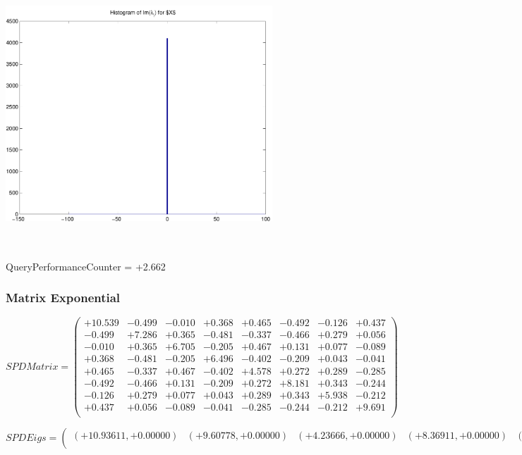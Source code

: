 \documentclass[9pt]{article}
\theoremstyle{plain}
\theoremstyle{definition}
\theoremstyle{remark}
\numberwithin{equation}{section}
\begin{document}
\includegraphics[width=10.0cm,height=10.0cm]{Im_lambda_n.pdf}

QueryPerformanceCounter  =  +2.662
\subsubsection{Matrix Exponential }
$SPD Matrix = \left(
\begin{array}{
cccccccc}
+10.539 & -0.499 & -0.010 & +0.368 & +0.465 & -0.492 & -0.126 & +0.437 \\
-0.499 & +7.286 & +0.365 & -0.481 & -0.337 & -0.466 & +0.279 & +0.056 \\
-0.010 & +0.365 & +6.705 & -0.205 & +0.467 & +0.131 & +0.077 & -0.089 \\
+0.368 & -0.481 & -0.205 & +6.496 & -0.402 & -0.209 & +0.043 & -0.041 \\
+0.465 & -0.337 & +0.467 & -0.402 & +4.578 & +0.272 & +0.289 & -0.285 \\
-0.492 & -0.466 & +0.131 & -0.209 & +0.272 & +8.181 & +0.343 & -0.244 \\
-0.126 & +0.279 & +0.077 & +0.043 & +0.289 & +0.343 & +5.938 & -0.212 \\
+0.437 & +0.056 & -0.089 & -0.041 & -0.285 & -0.244 & -0.212 & +9.691 \\
\end{array}
\right)$ \newline 

$SPD Eigs = \left(
\begin{array}{
cccccccc}
(+10.93611,+0.00000) & (+9.60778,+0.00000) & (+4.23666,+0.00000) & (+8.36911,+0.00000) & (+7.56229,+0.00000) & (+5.82791,+0.00000) & (+6.54198,+0.00000) & (+6.33139,+0.00000) \\
\end{array}
\right)$ \newline 
\end{document}
